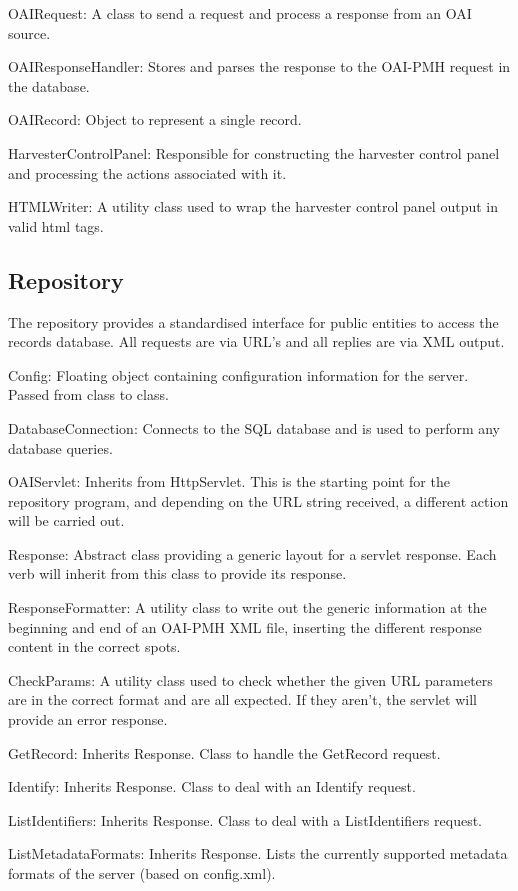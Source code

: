 \documentclass[a4paper,11pt]{article}
\begin{document}
OAIRequest: A class to send a request and process a response from an OAI source.

OAIResponseHandler: Stores and parses the response to the OAI-PMH request in the database.

OAIRecord: Object to represent a single record.

HarvesterControlPanel: Responsible for constructing the harvester control panel and processing the actions associated with it.

HTMLWriter: A utility class used to wrap the harvester control panel output in valid html tags.

\subsection{Repository}

The repository provides a standardised interface for public entities to access the records database. All requests are via URL's and all replies are via XML output.

Config: Floating object containing configuration information for the server. Passed from class to class.

DatabaseConnection: Connects to the SQL database and is used to perform any database queries.

OAIServlet: Inherits from HttpServlet. This is the starting point for the repository program, and depending on the URL string received, a different action will be carried out.

Response: Abstract class providing a generic layout for a servlet response. Each verb will inherit from this class to provide its response.

ResponseFormatter: A utility class to write out the generic information at the beginning and end of an OAI-PMH XML file, inserting the different response content in the correct spots.

CheckParams: A utility class used to check whether the given URL parameters are in the correct format and are all expected. If they aren't, the servlet will provide an error response.

GetRecord: Inherits Response. Class to handle the GetRecord request.

Identify: Inherits Response. Class to deal with an Identify request.

ListIdentifiers: Inherits Response. Class to deal with a ListIdentifiers request.

ListMetadataFormats: Inherits Response. Lists the currently supported metadata formats of the server (based on config.xml).
\end{document}
